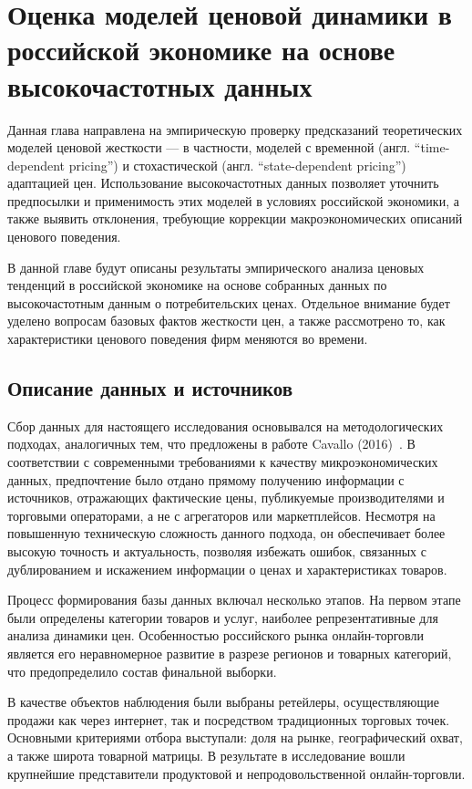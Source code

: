 \chapter{Оценка моделей ценовой динамики в российской экономике на основе высокочастотных данных}\label{ch:ch3}

Данная глава направлена на эмпирическую проверку предсказаний теоретических моделей ценовой жесткости — в частности, моделей с временной (англ. ``time-dependent pricing'') и стохастической (англ. ``state-dependent pricing'') адаптацией цен. Использование высокочастотных данных позволяет уточнить предпосылки и применимость этих моделей в условиях российской экономики, а также выявить отклонения, требующие коррекции макроэкономических описаний ценового поведения.

В данной главе будут описаны результаты эмпирического анализа ценовых тенденций в российской экономике на основе собранных данных по высокочастотным данным о потребительских ценах. Отдельное внимание будет уделено вопросам базовых фактов жесткости цен, а также рассмотрено то, как характеристики ценового поведения фирм меняются во времени.

\section{Описание данных и источников}

Сбор данных для настоящего исследования основывался на методологических подходах, аналогичных тем, что предложены в работе Cavallo (2016)~\cite{cavallo2016billion}. В соответствии с современными требованиями к качеству микроэкономических данных, предпочтение было отдано прямому получению информации с источников, отражающих фактические цены, публикуемые производителями и торговыми операторами, а не с агрегаторов или маркетплейсов. Несмотря на повышенную техническую сложность данного подхода, он обеспечивает более высокую точность и актуальность, позволяя избежать ошибок, связанных с дублированием и искажением информации о ценах и характеристиках товаров.

Процесс формирования базы данных включал несколько этапов. На первом этапе были определены категории товаров и услуг, наиболее репрезентативные для анализа динамики цен. Особенностью российского рынка онлайн-торговли является его неравномерное развитие в разрезе регионов и товарных категорий, что предопределило состав финальной выборки.

В качестве объектов наблюдения были выбраны ретейлеры, осуществляющие продажи как через интернет, так и посредством традиционных торговых точек. Основными критериями отбора выступали: доля на рынке, географический охват, а также широта товарной матрицы. В результате в исследование вошли крупнейшие представители продуктовой и непродовольственной онлайн-торговли.

